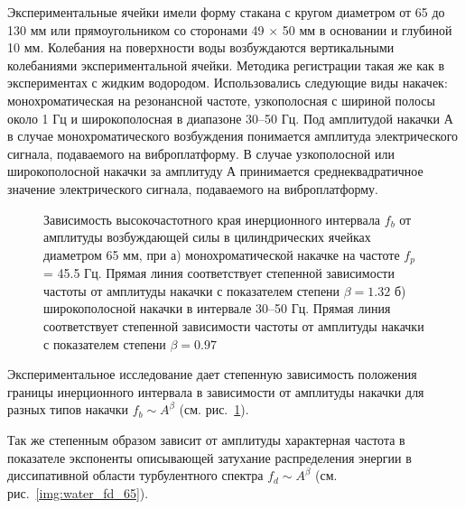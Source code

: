Экспериментальные ячейки имели форму стакана с кругом диаметром от 65 до 130 мм или прямоугольником со сторонами 49 $\times$ 50 мм в основании и глубиной 10 мм. Колебания на поверхности воды возбуждаются вертикальными колебаниями экспериментальной ячейки. Методика регистрации такая же как в экспериментах с жидким водородом. Использовались следующие виды накачек: монохроматическая на резонансной частоте, узкополосная с шириной полосы около 1 Гц и широкополосная в диапазоне 30–50 Гц. Под амплитудой накачки А в случае монохроматического возбуждения понимается амплитуда электрического сигнала, подаваемого на виброплатформу. В случае узкополосной или широкополосной накачки за амплитуду А принимается среднеквадратичное значение электрического сигнала, подаваемого на виброплатформу.

\begin{figure}[ht]
 \begin{minipage}[ht]{0.49\linewidth}
 \end{minipage}
 \hfill
 \begin{minipage}[ht]{0.49\linewidth}
 \end{minipage}
 \caption{Зависимость высокочастотного края инерционного интервала $f_b$ от амплитуды возбуждающей силы в цилиндрических ячейках диаметром 65 мм, при а) монохроматической накачке на частоте $f_p$ = 45.5 Гц. Прямая линия соответствует степенной зависимости частоты от амплитуды накачки с показателем степени $\beta = 1.32$
 б) широкополосной накачки в интервале 30–50 Гц. Прямая линия соответствует степенной зависимости частоты от амплитуды накачки с показателем степени $\beta = 0.97$}

 \label{img:water_fb_65} 
\end{figure}
Экспериментальное исследование дает степенную зависимость положения границы инерционного интервала в зависимости от амплитуды накачки для разных типов накачки $f_b \sim A^\beta$ (см. рис.~\ref{img:water_fb_65}).

 Так же степенным образом зависит от амплитуды характерная частота в показателе экспоненты описывающей затухание распределения энергии в диссипативной области турбулентного спектра $f_d \sim A^\beta$ (см. рис.~\ref{img:water_fd_65}).

